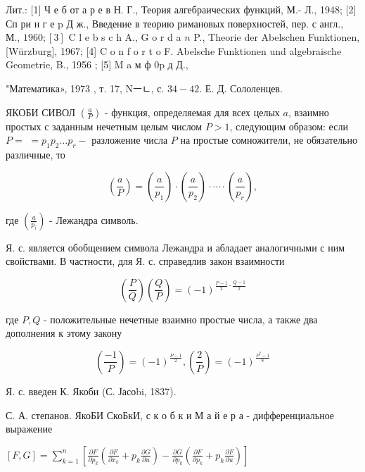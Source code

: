 \documentclass[10pt]{article}
\begin{document}
Лит.: [1] Ч е б от а р е в Н. Г., Теория алгебраических функций, М.- Л., 1948; [2] Сп ри н г е p Д ж., Введение в теорию римановых поверхностей, пер. с англ., М., $1960 ;[3]$ C l e b s c h A., G o r d a $n$ P., Theorie der Abelschen Funktionen, [Würzburg], 1967; [4] C o n f o r t o F. Abelsche Funktionen und algebraische Geometrie, B., 1956 ; [5] M a м ф $0 \mathrm{p}$ д Д.,



"Математика», 1973 , т. 17, Nㅡㄴ, с. $34-42$. Е. Д. Сололенцев.

ЯКОБИ СИВОЛ $\left(\frac{a}{P}\right)$ - функция, определяемая для всех целых $a$, взаимно простых с заданным нечетным целым числом $P>1$, следующим образом: если $P=$ $=p_{1} p_{2} \ldots p_{r}-$ разложение числа $P$ на простые сомножители, не обязательно различные, то



\[

\left(\frac{a}{P}\right)=\left(\frac{a}{p_{1}}\right) \cdot\left(\frac{a}{p_{2}}\right) \cdot \cdots \cdot\left(\frac{a}{p_{r}}\right),

\]



где $\left(\frac{a}{p_{i}}\right)$ - Лежандра символь.



Я. с. является обобщением символа Лежандра и абладает аналогичными с ним свойствами. В частности, для Я. с. справедлив закон взаимности



\[

\left(\frac{P}{Q}\right)\left(\frac{Q}{P}\right)=(-1)^{\frac{P-1}{2} \cdot \frac{Q-1}{2}}

\]



где $P, Q$ - положительные нечетные взаимно простые числа, а также два дополнения к этому закону



\[

\left(\frac{-1}{P}\right)=(-1)^{\frac{P-1}{2}},\left(\frac{2}{P}\right)=(-1)^{\frac{P^{2}-1}{8}}

\]



Я. с. введен К. Якоби (С. Јасоbi, 1837).



С. А. степанов. ЯкоБИ СкоБкИ, с к о б к и М а й е р а - дифференциальное выражение



$[F, G]=\sum_{k=1}^{n}\left[\frac{\partial F}{\partial p_{k}}\left(\frac{\partial F}{\partial x_{k}}+p_{k} \frac{\partial G}{\partial u}\right)-\frac{\partial G}{\partial p_{k}}\left(\frac{\partial F}{\partial p_{k}}+p_{k} \frac{\partial F}{\partial u}\right)\right]$
\end{document}
